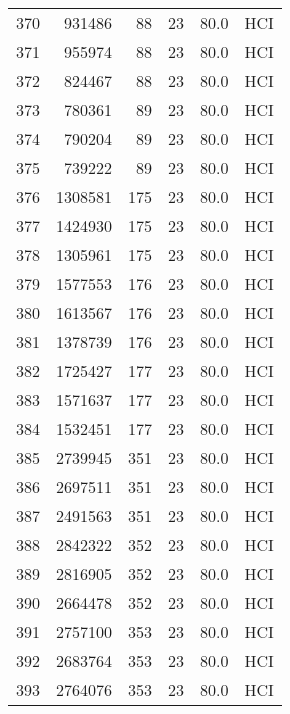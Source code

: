 \begin{longtable}{lrrrrl}
370 &    931486 &         88 &        23 &           80.0 &  HCI \\
371 &    955974 &         88 &        23 &           80.0 &  HCI \\
372 &    824467 &         88 &        23 &           80.0 &  HCI \\
373 &    780361 &         89 &        23 &           80.0 &  HCI \\
374 &    790204 &         89 &        23 &           80.0 &  HCI \\
375 &    739222 &         89 &        23 &           80.0 &  HCI \\
376 &   1308581 &        175 &        23 &           80.0 &  HCI \\
377 &   1424930 &        175 &        23 &           80.0 &  HCI \\
378 &   1305961 &        175 &        23 &           80.0 &  HCI \\
379 &   1577553 &        176 &        23 &           80.0 &  HCI \\
380 &   1613567 &        176 &        23 &           80.0 &  HCI \\
381 &   1378739 &        176 &        23 &           80.0 &  HCI \\
382 &   1725427 &        177 &        23 &           80.0 &  HCI \\
383 &   1571637 &        177 &        23 &           80.0 &  HCI \\
384 &   1532451 &        177 &        23 &           80.0 &  HCI \\
385 &   2739945 &        351 &        23 &           80.0 &  HCI \\
386 &   2697511 &        351 &        23 &           80.0 &  HCI \\
387 &   2491563 &        351 &        23 &           80.0 &  HCI \\
388 &   2842322 &        352 &        23 &           80.0 &  HCI \\
389 &   2816905 &        352 &        23 &           80.0 &  HCI \\
390 &   2664478 &        352 &        23 &           80.0 &  HCI \\
391 &   2757100 &        353 &        23 &           80.0 &  HCI \\
392 &   2683764 &        353 &        23 &           80.0 &  HCI \\
393 &   2764076 &        353 &        23 &           80.0 &  HCI \\
\end{longtable}
